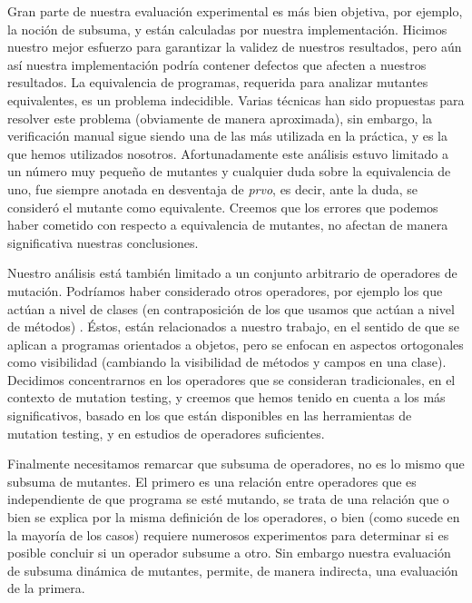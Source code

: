 Gran parte de nuestra evaluaci\'on experimental es m\'as bien objetiva, por ejemplo, la noci\'on de subsuma, y est\'an calculadas por nuestra implementaci\'on. Hicimos nuestro mejor esfuerzo para garantizar la validez de nuestros resultados, pero a\'un as\'i nuestra implementaci\'on podr\'ia contener defectos que afecten a nuestros resultados. La equivalencia de programas, requerida para analizar mutantes equivalentes, es un problema indecidible. Varias t\'ecnicas han sido propuestas para resolver este problema (obviamente de manera aproximada), sin embargo, la verificaci\'on manual sigue siendo una de las m\'as utilizada en la pr\'actica, y es la que hemos utilizados nosotros. Afortunadamente este an\'alisis estuvo limitado a un n\'umero muy peque\~no de mutantes y cualquier duda sobre la equivalencia de uno, fue siempre anotada en desventaja de \emph{prvo}, es decir, ante la duda, se consider\'o el mutante como equivalente. Creemos que los errores que podemos haber cometido con respecto a equivalencia de mutantes, no afectan de manera significativa nuestras conclusiones.

Nuestro an\'alisis est\'a tambi\'en limitado a un conjunto arbitrario de operadores de mutaci\'on. Podr\'iamos haber considerado otros operadores, por ejemplo los que act\'uan a nivel de clases (en contraposici\'on de los que usamos que act\'uan a nivel de m\'etodos) \cite{bibliography.mutation.class-level-ops}. \'Estos, est\'an relacionados a nuestro trabajo, en el sentido de que se aplican a programas orientados a objetos, pero se enfocan en aspectos ortogonales como visibilidad (cambiando la visibilidad de m\'etodos y campos en una clase). Decidimos concentrarnos en los operadores que se consideran tradicionales, en el contexto de mutation testing, y creemos que hemos tenido en cuenta a los m\'as significativos, basado en los que est\'an disponibles en las herramientas de mutation testing, y en estudios de operadores suficientes.

Finalmente necesitamos remarcar que subsuma de operadores, no es lo mismo que subsuma de mutantes. El primero es una relaci\'on entre operadores que es independiente de que programa se est\'e mutando, se trata de una relaci\'on que o bien se explica por la misma definici\'on de los operadores, o bien (como sucede en la mayor\'ia de los casos) requiere numerosos experimentos para determinar si es posible concluir si un operador subsume a otro. Sin embargo nuestra evaluaci\'on de subsuma din\'amica de mutantes, permite, de manera indirecta, una evaluaci\'on de la primera.